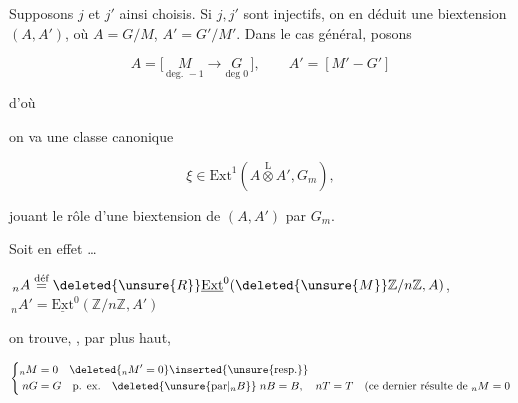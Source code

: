 
Supposons $j$ et $j'$ ainsi choisis. Si $j,j'$ sont injectifs, on en déduit une biextension   $(A,A')$, où $A=G/M$, $A'=G'/M'$. Dans le cas général, posons


\[ A=\bigl[\,\underset{\text{deg. }-1}{M}\longrightarrow\underset{\text{deg }0}{G}\,\bigr],\qquad A'=[M'\mathbin{-}G'] \]

d'où

on va  une  classe canonique

\[\xi\in\mathrm{Ext}^{1}(A\overset{\mathrm L}{\otimes}A',G_m),\]

jouant le rôle d'une biextension de $(A,A')$ par $G_m$.


Soit en effet \ldots

\quad $\,{}_nA\overset{\text{déf}}{=}\deleted{\unsure{R}}\underline{\mathrm{Ext}}^{0}(\deleted{\unsure{M}}\mathbb{Z}/n\mathbb{Z},A)$, $\,{}_nA'=\underline{\mathrm{Ext}}^0(\mathbb{Z}/n\mathbb{Z},A')$

on trouve, , par  plus haut,


\uline{}
\[\left\{\begin{aligned}
 {}_nM&=0\quad\deleted{{}_nM'=0}\inserted{\unsure{\text{resp.}}}\\
 nG&=G\quad\text{p. ex.}\quad\deleted{\unsure{\text{par}|{}_nB}}\;nB=B,\quad nT=T\quad(\text{ce dernier résulte de }{}_nM=0
\end{aligned}\right.\]

